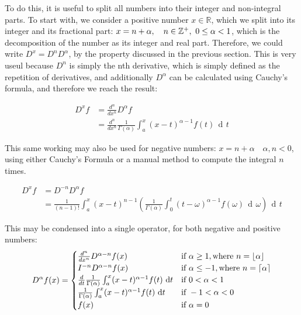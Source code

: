 \documentclass{article}
\def\squad{\hskip2\fontdimen3\font}
\DeclareMathOperator{\di}{\,d\!}
\DeclarePairedDelimiter\ceil{\lceil}{\rceil}
\DeclarePairedDelimiter\floor{\lfloor}{\rfloor}
\begin{document}
To do this, it is useful to split all numbers into their integer and
non-integral parts. To start with, we consider a positive number $x \in
\mathbb{R}$, which we split into its integer and its fractional part: $x = n +
\alpha, \quad n \in \mathbb{Z}^+, \squad 0 \leq \alpha < 1$, which is the
decomposition of the number as its integer and real part. Therefore, we could
write $D^x=D^nD^\alpha$, by the property discussed in the previous
section. This is very useul because $D^n$ is simply the nth derivative, which
is simply defined as the repetition of derivatives, and additionally $D^\alpha$
can be calculated using Cauchy's formula, and therefore we reach the result:

\begin{align*}
	D^x f   &= \frac{d^n}{dx^n} D^\alpha f \\
			&= \frac{d^n}{dx^n} \frac{1}{\Gamma\left(\alpha\right)}
			 \int_a^x (x-t)^{\alpha-1} f(t) \di t
\end{align*}

This same working may also be used for negative numbers: $x = n + \alpha \quad
\alpha,n < 0$, using either Cauchy's Formula or a manual method to compute the
integral $n$ times.

\begin{align*}
	D^x f   &= D^{-n} D^\alpha f \\
			&= \frac{1}{(n-1)!} \int_a^x (x-t)^{n-1}
			 \left(\frac{1}{\Gamma\left(\alpha\right)}
			 \int_0^t (t-\omega)^{\alpha - 1} f(\omega) \di \omega\right)\di t
\end{align*}

This may be condensed into a single operator, for both negative and positive
numbers:
\begin{equation*}
	D^\alpha f(x) =
	\begin{cases}
		\frac{d^n}{dx^n} D^{\alpha - n} f(x)
		& \text{if } \alpha \geq 1, \text{where } n = \floor{\alpha}\\

		I^{-n}D^{\alpha - n} f(x)
		& \text{if } \alpha \leq -1, \text{where } n = \ceil{\alpha} \\

		\frac{d}{dt} \frac{1}{\Gamma\left(\alpha\right)} \int_a^x (x-t)^{\alpha-1} f(t) \di t
		& \text{if } 0 < \alpha < 1 \\

		\frac{1}{\Gamma\left(\alpha\right)} \int_a^x (x-t)^{\alpha-1} f(t) \di t
		& \text{if } -1 < \alpha < 0 \\

		f(x) & \text{if } \alpha = 0
	\end{cases}
\end{equation*}
\end{document}
